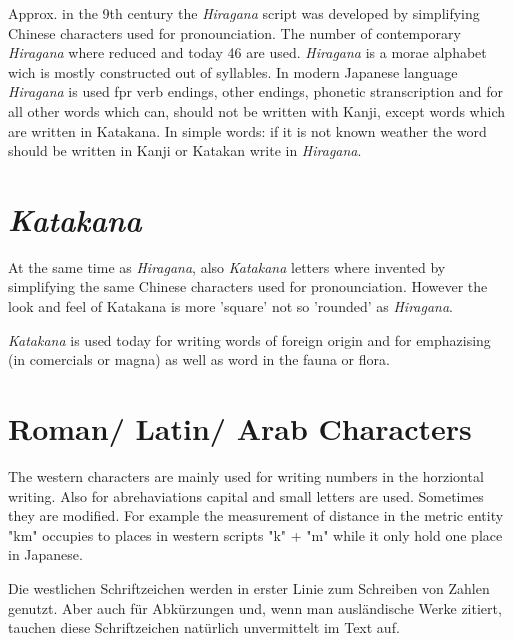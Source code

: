 Approx. in the 9th century the \textit{Hiragana} script was developed by
simplifying Chinese characters used for pronounciation. The number of
contemporary \textit{Hiragana} where reduced and today 46 are used.
\textit{Hiragana} is a morae alphabet wich is mostly constructed out of
syllables. In modern Japanese language \textit{Hiragana} is used fpr  verb
endings, other endings, phonetic stranscription and for all other words which
can, should not be written with Kanji, except words which are written in
Katakana. In simple words: if it is not known weather the word should be
written in Kanji or Katakan write in \textit{Hiragana}.

\section*{\textit{Katakana}}

At the same time as \textit{Hiragana}, also  \textit{Katakana} letters where
invented by simplifying the same Chinese characters used for pronounciation.
However the look and feel of Katakana is more 'square' not so 'rounded' as
\textit{Hiragana}.

\textit{Katakana} is used today for writing words of foreign origin and for
emphazising (in comercials or magna) as well as word in the fauna or flora. 

\section*{Roman/ Latin/ Arab Characters}

The western characters are mainly used for writing numbers in the horziontal
writing. Also for abrehaviations capital and small letters are used. Sometimes
they are modified. For example the measurement of distance in the metric entity
"km" occupies to places in western scripts "k" + "m" while it only hold
one place in Japanese.

Die westlichen Schriftzeichen werden in erster Linie zum Schreiben 
von Zahlen genutzt. Aber auch f\"ur Abk\"urzungen und, wenn man 
ausl\"andische Werke zitiert, tauchen diese Schriftzeichen 
nat\"urlich unvermittelt im Text auf.

